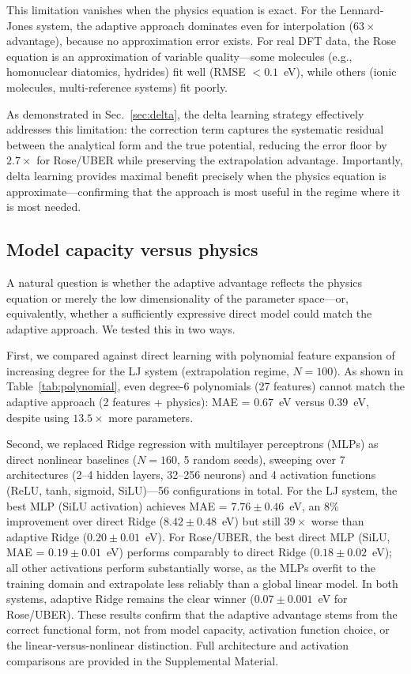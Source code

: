 \documentclass[aps,prb,twocolumn,superscriptaddress,longbibliography,floatfix]{revtex4-2}
\begin{document}
This limitation vanishes when the physics equation is exact. For the Lennard-Jones system, the adaptive approach dominates even for interpolation ($63\times$ advantage), because no approximation error exists. For real DFT data, the Rose equation is an approximation of variable quality---some molecules (e.g., homonuclear diatomics, hydrides) fit well (RMSE $< 0.1$~eV), while others (ionic molecules, multi-reference systems) fit poorly.

As demonstrated in Sec.~\ref{sec:delta}, the delta learning strategy effectively addresses this limitation: the correction term captures the systematic residual between the analytical form and the true potential, reducing the error floor by $2.7\times$ for Rose/UBER while preserving the extrapolation advantage. Importantly, delta learning provides maximal benefit precisely when the physics equation is approximate---confirming that the approach is most useful in the regime where it is most needed.

\subsection{Model capacity versus physics}
\label{sec:capacity}

A natural question is whether the adaptive advantage reflects the physics equation or merely the low dimensionality of the parameter space---or, equivalently, whether a sufficiently expressive direct model could match the adaptive approach. We tested this in two ways.

First, we compared against direct learning with polynomial feature expansion of increasing degree for the LJ system (extrapolation regime, $N = 100$). As shown in Table~\ref{tab:polynomial}, even degree-6 polynomials (27 features) cannot match the adaptive approach (2 features + physics): MAE = 0.67~eV versus 0.39~eV, despite using $13.5\times$ more parameters.

Second, we replaced Ridge regression with multilayer perceptrons (MLPs) as direct nonlinear baselines ($N = 160$, 5 random seeds), sweeping over 7 architectures (2--4 hidden layers, 32--256 neurons) and 4 activation functions (ReLU, tanh, sigmoid, SiLU)---56 configurations in total. For the LJ system, the best MLP (SiLU activation) achieves MAE = $7.76 \pm 0.46$~eV, an 8\% improvement over direct Ridge ($8.42 \pm 0.48$~eV) but still $39\times$ worse than adaptive Ridge ($0.20 \pm 0.01$~eV). For Rose/UBER, the best direct MLP (SiLU, MAE = $0.19 \pm 0.01$~eV) performs comparably to direct Ridge ($0.18 \pm 0.02$~eV); all other activations perform substantially worse, as the MLPs overfit to the training domain and extrapolate less reliably than a global linear model. In both systems, adaptive Ridge remains the clear winner ($0.07 \pm 0.001$~eV for Rose/UBER). These results confirm that the adaptive advantage stems from the correct functional form, not from model capacity, activation function choice, or the linear-versus-nonlinear distinction. Full architecture and activation comparisons are provided in the Supplemental Material.
\end{document}
